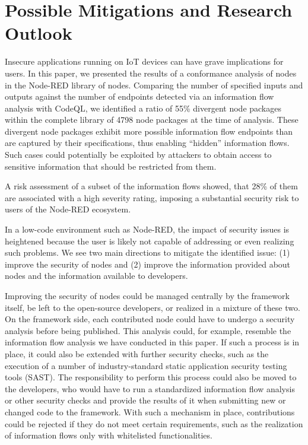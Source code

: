 \section{Possible Mitigations and Research Outlook}
\label{sec:conclusion}

Insecure applications running on IoT devices can have grave implications for users.
In this paper, we presented the results of a conformance analysis of nodes in the Node-RED library of nodes.
Comparing the number of specified inputs and outputs against the number of endpoints detected via an information flow analysis with CodeQL, we identified a ratio of 55\% divergent node packages within the complete library of 4798 node packages at the time of analysis.
These divergent node packages exhibit more possible information flow endpoints than are captured by their specifications, thus enabling ``hidden'' information flows.
Such cases could potentially be exploited by attackers to obtain access to sensitive information that should be restricted from them.

A risk assessment of a subset of the information flows showed, that 28\% of them are associated with a high severity rating, imposing a substantial security risk to users of the Node-RED ecosystem.

In a low-code environment such as Node-RED, the impact of security issues is heightened because the user is likely not capable of addressing or even realizing such problems.
We see two main directions to mitigate the identified issue: (1) improve the security of nodes and (2) improve the information provided about nodes and the information available to developers.

Improving the security of nodes could be managed centrally by the framework itself, be left to the open-source developers, or realized in a mixture of these two.
On the framework side, each contributed node could have to undergo a security analysis before being published.
This analysis could, for example, resemble the information flow analysis we have conducted in this paper.
If such a process is in place, it could also be extended with further security checks, such as the execution of a number of industry-standard static application security testing tools (SAST).
The responsibility to perform this process could also be moved to the developers, who would have to run a standardized information flow analysis or other security checks and provide the results of it when submitting new or changed code to the framework.
With such a mechanism in place, contributions could be rejected if they do not meet certain requirements, such as the realization of information flows only with whitelisted functionalities.


